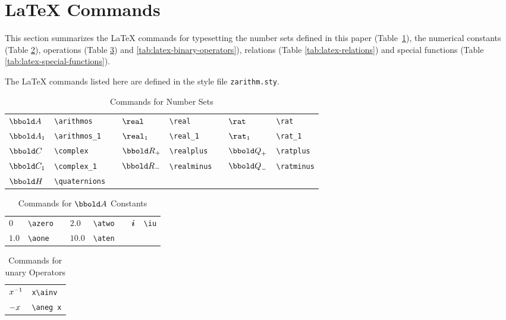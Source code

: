 \documentclass[12pt]{article}
\begin{document}
\section{\LaTeX{} Commands}
\label{sec:latex-commands}
This section summarizes the \LaTeX{} commands for typesetting the
number sets defined in this paper (Table~\ref{tab:latex-number-sets}),
the numerical constants (Table \ref{tab:latex-constants}), operations
(Table \ref{tab:latex-unary-operators}) and
\ref{tab:latex-binary-operators}), relations (Table
\ref{tab:latex-relations}) and special functions (Table
\ref{tab:latex-special-functions}).

The \LaTeX{} commands listed here are defined in the style file
\verb|zarithm.sty|.

\begin{table}[htbp]
  \centering
  \begin{tabular}{llp{1cm}llp{1cm}ll}
    $\arithmos$    & \verb|\arithmos| && $\real$ & \verb|\real|&& $\rat$ & \verb|\rat| \\
    $\arithmos_1$  & \verb|\arithmos_1| && $\real_1$ & \verb|\real_1| && $\rat_1$ & \verb|\rat_1| \\
    $\complex$ & \verb|\complex| &&  $\realplus$ & \verb|\realplus| && $\ratplus$ & \verb|\ratplus| \\ 
    $\complex_1$ & \verb|\complex_1| && $\realminus$ &
                                                       \verb|\realminus| && $\ratminus$ & \verb|\ratminus| \\
    $\quaternions$ & \verb|\quaternions| &&  & && &    \\
  \end{tabular}
  \caption{Commands for Number Sets}
  \label{tab:latex-number-sets}
\end{table}
%
\begin{table}[htbp]
  \centering
  \begin{tabular}{llp{1cm}llp{1cm}ll}
    $0$    & \verb|\azero| && $2.0$  & \verb|\atwo| && $\bm{i}$  & \verb|\iu| \\
    $1.0$  & \verb|\aone| && $10.0$ & \verb|\aten| && & \\
  \end{tabular}
  \caption{Commands for $\arithmos$ Constants}
  \label{tab:latex-constants}
\end{table}
%
\begin{table}[htbp]
  \centering
  \begin{tabular}{ll}
    $x^{-1}$    & \verb|x\ainv| \\
    $- x$    & \verb|\aneg x| \\
  \end{tabular}
  \caption{Commands for unary Operators}
  \label{tab:latex-unary-operators}
\end{table}
\end{document}
